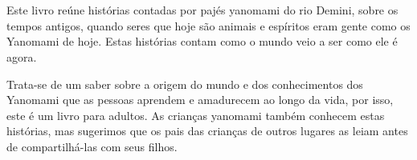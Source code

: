 
\chapter*{}

Este livro reúne histórias contadas por pajés yanomami do rio Demini, sobre os tempos antigos, quando seres que hoje são animais e espíritos eram gente como os Yanomami de hoje. Estas histórias contam como o mundo veio a ser como ele é agora. 

Trata-se de um saber sobre a origem do mundo e dos conhecimentos dos Yanomami que as pessoas aprendem e amadurecem ao longo da vida, por isso, este é um livro para adultos. As crianças yanomami também conhecem estas histórias, mas sugerimos que os pais das crianças de outros lugares as leiam antes de compartilhá-las com seus filhos.